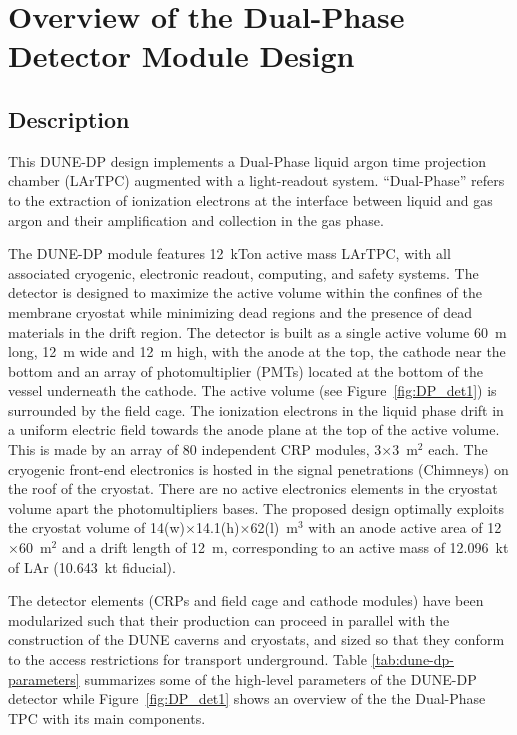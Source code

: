 \chapter{Overview of the Dual-Phase Detector Module Design}
\label{ch:fddp-ov}

\section{Description}
\label{sec:fddp-ov-description}

This DUNE-DP design implements a Dual-Phase liquid argon time projection chamber (LArTPC) augmented with a light-readout system. ``Dual-Phase'' refers to the extraction of ionization electrons at the interface between liquid and gas argon and their amplification and collection in the gas phase.

The DUNE-DP module features 12~kTon active mass LArTPC, with all associated cryogenic, electronic readout, computing, and safety systems. The detector is designed to maximize the active volume within the confines of the membrane cryostat while minimizing dead regions and the presence of dead materials in the drift region. The detector is built as a single active volume 60~m long, 12~m wide and 12~m high, with the anode at the top, the cathode near the bottom and an array of photomultiplier (PMTs) located at the bottom of the vessel underneath the cathode. The active volume (see Figure~\ref{fig:DP_det1}) is surrounded by the field cage. The ionization electrons in the liquid phase drift  in a uniform electric field towards the anode plane at the top of the active volume. This is made by an array of 80 independent CRP modules, 3$\times$3~m$^2$ each. The cryogenic front-end electronics is hosted in the signal penetrations (Chimneys) on the roof of the cryostat. There are no active electronics elements in the cryostat volume apart the photomultipliers bases.
The proposed design optimally exploits the cryostat volume of 14(w)$\times$14.1(h)$\times$62(l)~m$^3$ with an anode active area of 12$\times$60~m$^2$ and a drift length of 12~m, corresponding to an active mass of 12.096~kt of LAr (10.643~kt fiducial). 

The detector elements (CRPs and field cage and cathode modules) have been modularized such that their production can proceed in parallel with the construction of the DUNE caverns and cryostats, and sized so that they conform to the access restrictions for transport underground. Table \ref{tab:dune-dp-parameters} summarizes some of the high-level parameters of the DUNE-DP detector while Figure~\ref{fig:DP_det1} shows an overview of the  the Dual-Phase TPC  with its main components.

